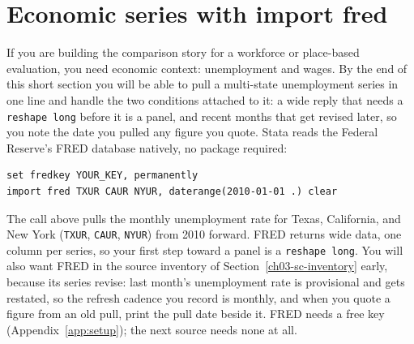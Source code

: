 \section{Economic series with import fred}
If you are building the comparison story for a workforce or place-based evaluation, you need economic context: unemployment and wages. By the end of this short section you will be able to pull a multi-state unemployment series in one line and handle the two conditions attached to it: a wide reply that needs a \texttt{reshape long} before it is a panel, and recent months that get revised later, so you note the date you pulled any figure you quote. Stata reads the Federal Reserve's FRED database natively, no package required:
\par
{\footnotesize
\begin{verbatim}
set fredkey YOUR_KEY, permanently
import fred TXUR CAUR NYUR, daterange(2010-01-01 .) clear
\end{verbatim}
}
The call above pulls the monthly unemployment rate for Texas, California, and New York (\texttt{TXUR}, \texttt{CAUR}, \texttt{NYUR}) from 2010 forward. FRED returns wide data, one column per series, so your first step toward a panel is a \texttt{reshape long}. You will also want FRED in the source inventory of Section~\ref{ch03-sc-inventory} early, because its series revise: last month's unemployment rate is provisional and gets restated, so the refresh cadence you record is monthly, and when you quote a figure from an old pull, print the pull date beside it. FRED needs a free key (Appendix~\ref{app:setup}); the next source needs none at all.

